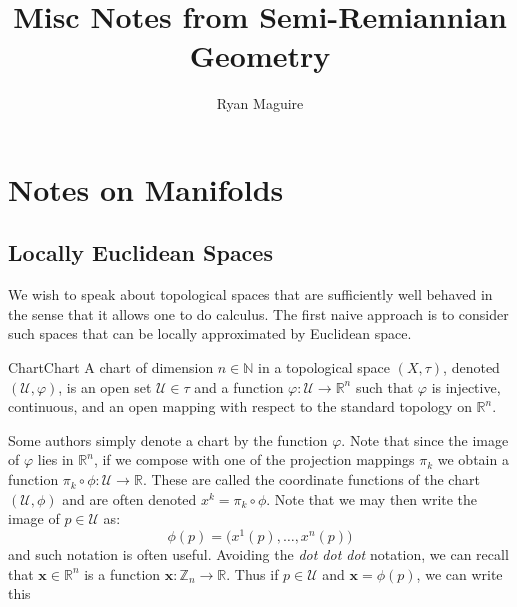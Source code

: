\documentclass[oneside]{book}                                                  %
\begin{document}
    \title{Misc Notes from Semi-Remiannian Geometry}
    \author{Ryan Maguire}
    \date{\vspace{-5ex}}
    \maketitle
    \tableofcontents
    \chapter{Notes on Manifolds}
        \section{Locally Euclidean Spaces}
            We wish to speak about topological spaces that are sufficiently well
            behaved in the sense that it allows one to do calculus. The first
            naive approach is to consider such spaces that can be locally
            approximated by Euclidean space.
            \begin{fdefinition}{Chart}{Chart}
                A chart of dimension $n\in\mathbb{N}$ in a topological space
                $(X,\tau)$, denoted $(\mathcal{U},\varphi)$, is an open set
                $\mathcal{U}\in\tau$ and a function
                $\varphi:\mathcal{U}\rightarrow\mathbb{R}^{n}$ such that
                $\varphi$ is injective, continuous, and an open mapping with
                respect to the standard topology on $\mathbb{R}^{n}$.
            \end{fdefinition}
            Some authors simply denote a chart by the function $\varphi$. Note
            that since the image of $\varphi$ lies in $\mathbb{R}^{n}$, if we
            compose with one of the projection mappings $\pi_{k}$ we obtain a
            function $\pi_{k}\circ\phi:\mathcal{U}\rightarrow\mathbb{R}$. These
            are called the coordinate functions of the chart
            $(\mathcal{U},\phi)$ and are often denoted $x^{k}=\pi_{k}\circ\phi$.
            Note that we may then write the image of $p\in\mathcal{U}$ as:
            \begin{equation}
                \phi(p)=\big(x^{1}(p),\dots,x^{n}(p)\big)
            \end{equation}
            and such notation is often useful. Avoiding the \textit{dot dot dot}
            notation, we can recall that $\mathbf{x}\in\mathbb{R}^{n}$ is a
            function $\mathbf{x}:\mathbb{Z}_{n}\rightarrow\mathbb{R}$. Thus if
            $p\in\mathcal{U}$ and $\mathbf{x}=\phi(p)$, we can write this
\end{document}
